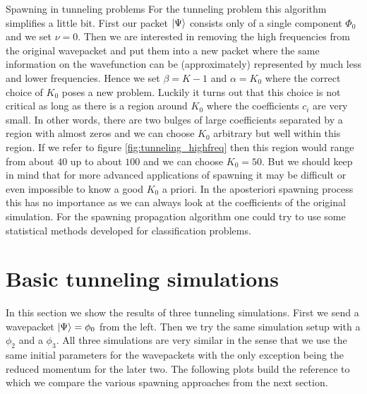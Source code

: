 \begin{chapter}{Spawning in tunneling problems}
For the tunneling problem this algorithm simplifies a little bit. First our
packet $\Ket{\Psi}$ consists only of a single component $\Phi_0$ and we set
$\nu = 0$. Then we are interested in removing the high frequencies from
the original wavepacket and put them into a new packet where the same information
on the wavefunction can be (approximately) represented by much less and lower frequencies.
Hence we set $\beta = K-1$ and $\alpha = K_0$ where the correct choice of $K_0$ poses
a new problem. Luckily it turns out that this choice is not critical as long
as there is a region around $K_0$ where the coefficients $c_i$ are very small.
In other words, there are two bulges of large coefficients separated by a region
with almost zeros and we can choose $K_0$ arbitrary but well within this region.
If we refer to figure \ref{fig:tunneling_highfreq} then this region would range
from about $40$ up to about $100$ and we can choose $K_0 = 50$. But we should keep
in mind that for more advanced applications of spawning it may be difficult or
even impossible to know a good $K_0$ a priori. In the aposteriori spawning process
this has no importance as we can always look at the coefficients of the original
simulation. For the spawning propagation algorithm one could try to use some
statistical methods developed for classification problems.


\FloatBarrier
\section{Basic tunneling simulations}

In this section we show the results of three tunneling simulations.
First we send a wavepacket $\Ket{\Psi} = \phi_0$ from the left. Then we try the
same simulation setup with a $\phi_2$ and a $\phi_3$. All three simulations
are very similar in the sense that we use the same initial parameters for
the wavepackets with the only exception being the reduced momentum for the later
two. The following plots build the reference to which we compare the various
spawning approaches from the next section.


\end{chapter}
